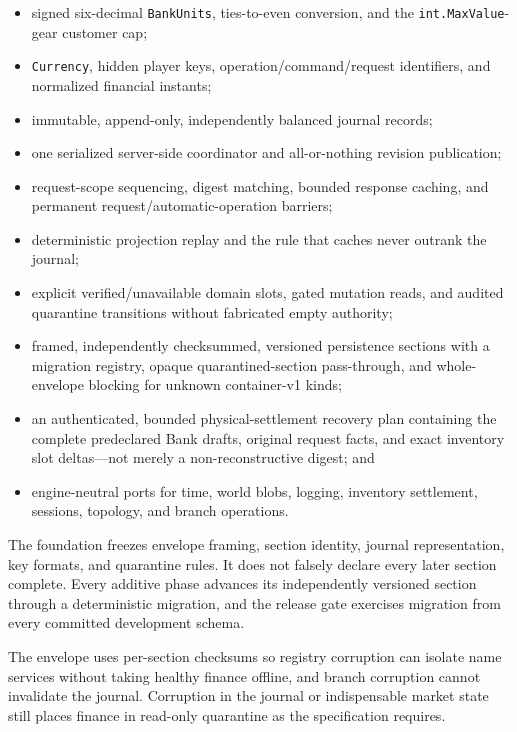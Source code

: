 \documentclass[
  9pt,
  letterpaper,
]{extarticle}
\newcommand{\passthrough}[1]{#1}
\providecommand{\tightlist}{%
  \setlength{\itemsep}{0pt}\setlength{\parskip}{0pt}}
\begin{document}
\begin{itemize}
\tightlist
\item
  signed six-decimal \passthrough{\lstinline!BankUnits!}, ties-to-even
  conversion, and the \passthrough{\lstinline!int.MaxValue!}-gear
  customer cap;
\item
  \passthrough{\lstinline!Currency!}, hidden player keys,
  operation/\allowbreak{}command/\allowbreak{}request identifiers, and
  normalized financial instants;
\item
  immutable, append-only, independently balanced journal records;
\item
  one serialized server-side coordinator and all-or-nothing revision
  publication;
\item
  request-scope sequencing, digest matching, bounded response caching,
  and permanent request/automatic-operation barriers;
\item
  deterministic projection replay and the rule that caches never outrank
  the journal;
\item
  explicit verified/unavailable domain slots, gated mutation reads, and
  audited quarantine transitions without fabricated empty authority;
\item
  framed, independently checksummed, versioned persistence sections with
  a migration registry, opaque quarantined-section pass-through, and
  whole-envelope blocking for unknown container-v1 kinds;
\item
  an authenticated, bounded physical-settlement recovery plan containing
  the complete predeclared Bank drafts, original request facts, and
  exact inventory slot deltas---not merely a non-reconstructive digest;
  and
\item
  engine-neutral ports for time, world blobs, logging, inventory
  settlement, sessions, topology, and branch operations.
\end{itemize}

The foundation freezes envelope framing, section identity, journal
representation, key formats, and quarantine rules. It does not falsely
declare every later section complete. Every additive phase advances its
independently versioned section through a deterministic migration, and
the release gate exercises migration from every committed development
schema.

The envelope uses per-section checksums so registry corruption can
isolate name services without taking healthy finance offline, and branch
corruption cannot invalidate the journal. Corruption in the journal or
indispensable market state still places finance in read-only quarantine
as the specification requires.
\end{document}
